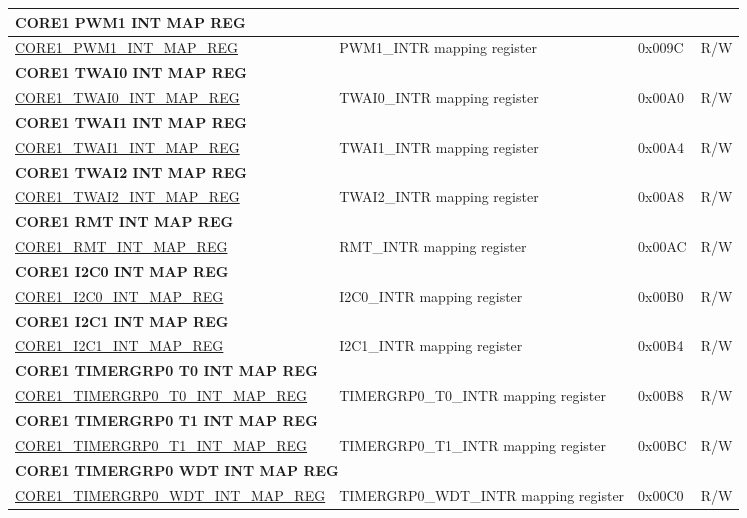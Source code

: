 \begin{longtable}{ | p{7.5cm} | p{7.2cm} | p{1.3cm} | p{1cm} | }
\multicolumn{4}{|l|}{\textbf{CORE1 PWM1 INT MAP REG}} \\ \hline
\hyperref[regdesc:CORE1PWM1INTMAPREG]{CORE1\_PWM1\_INT\_MAP\_REG} & PWM1\_INTR mapping register & 0x009C & R/W \\ \hline
\multicolumn{4}{|l|}{\textbf{CORE1 TWAI0 INT MAP REG}} \\ \hline
\hyperref[regdesc:CORE1TWAI0INTMAPREG]{CORE1\_TWAI0\_INT\_MAP\_REG} & TWAI0\_INTR mapping register & 0x00A0 & R/W \\ \hline
\multicolumn{4}{|l|}{\textbf{CORE1 TWAI1 INT MAP REG}} \\ \hline
\hyperref[regdesc:CORE1TWAI1INTMAPREG]{CORE1\_TWAI1\_INT\_MAP\_REG} & TWAI1\_INTR mapping register & 0x00A4 & R/W \\ \hline
\multicolumn{4}{|l|}{\textbf{CORE1 TWAI2 INT MAP REG}} \\ \hline
\hyperref[regdesc:CORE1TWAI2INTMAPREG]{CORE1\_TWAI2\_INT\_MAP\_REG} & TWAI2\_INTR mapping register & 0x00A8 & R/W \\ \hline
\multicolumn{4}{|l|}{\textbf{CORE1 RMT INT MAP REG}} \\ \hline
\hyperref[regdesc:CORE1RMTINTMAPREG]{CORE1\_RMT\_INT\_MAP\_REG} & RMT\_INTR mapping register & 0x00AC & R/W \\ \hline
\multicolumn{4}{|l|}{\textbf{CORE1 I2C0 INT MAP REG}} \\ \hline
\hyperref[regdesc:CORE1I2C0INTMAPREG]{CORE1\_I2C0\_INT\_MAP\_REG} & I2C0\_INTR mapping register & 0x00B0 & R/W \\ \hline
\multicolumn{4}{|l|}{\textbf{CORE1 I2C1 INT MAP REG}} \\ \hline
\hyperref[regdesc:CORE1I2C1INTMAPREG]{CORE1\_I2C1\_INT\_MAP\_REG} & I2C1\_INTR mapping register & 0x00B4 & R/W \\ \hline
\multicolumn{4}{|l|}{\textbf{CORE1 TIMERGRP0 T0 INT MAP REG}} \\ \hline
\hyperref[regdesc:CORE1TIMERGRP0T0INTMAPREG]{CORE1\_TIMERGRP0\_T0\_INT\_MAP\_REG} & TIMERGRP0\_T0\_INTR mapping register & 0x00B8 & R/W \\ \hline
\multicolumn{4}{|l|}{\textbf{CORE1 TIMERGRP0 T1 INT MAP REG}} \\ \hline
\hyperref[regdesc:CORE1TIMERGRP0T1INTMAPREG]{CORE1\_TIMERGRP0\_T1\_INT\_MAP\_REG} & TIMERGRP0\_T1\_INTR mapping register & 0x00BC & R/W \\ \hline
\multicolumn{4}{|l|}{\textbf{CORE1 TIMERGRP0 WDT INT MAP REG}} \\ \hline
\hyperref[regdesc:CORE1TIMERGRP0WDTINTMAPREG]{CORE1\_TIMERGRP0\_WDT\_INT\_MAP\_REG} & TIMERGRP0\_WDT\_INTR mapping register & 0x00C0 & R/W \\ \hline

\end{longtable}

